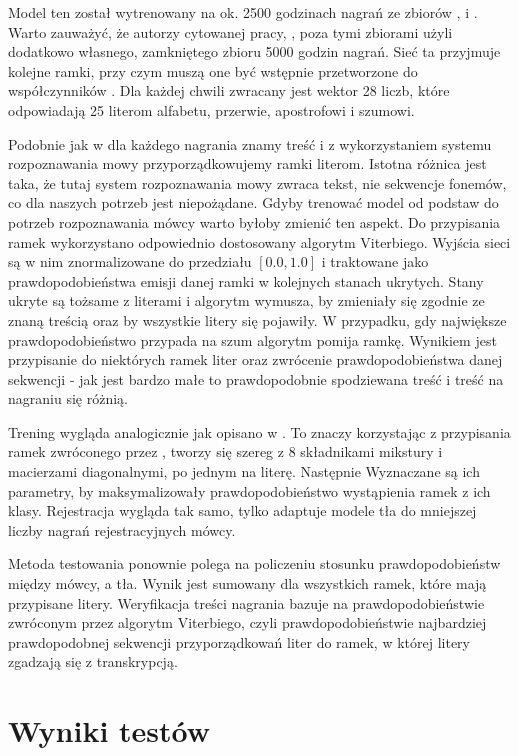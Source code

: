 Model ten został wytrenowany na ok. 2500 godzinach nagrań ze zbiorów , 
i . Warto zauważyć, że autorzy cytowanej pracy, , poza tymi zbiorami użyli
dodatkowo własnego, zamkniętego zbioru 5000 godzin nagrań. Sieć ta przyjmuje kolejne ramki, przy czym muszą
one być wstępnie przetworzone do współczynników . Dla każdej chwili zwracany jest wektor 28 liczb,
które odpowiadają 25 literom alfabetu, przerwie, apostrofowi i szumowi.

Podobnie jak w  dla każdego nagrania znamy treść i z wykorzystaniem systemu rozpoznawania
mowy przyporządkowujemy ramki literom. Istotna różnica jest taka, że tutaj system rozpoznawania mowy zwraca
tekst, nie sekwencje fonemów, co dla naszych potrzeb jest niepożądane. Gdyby trenować model od podstaw do
potrzeb rozpoznawania mówcy warto byłoby zmienić ten aspekt. Do przypisania ramek wykorzystano odpowiednio
dostosowany algorytm Viterbiego. Wyjścia sieci są w nim znormalizowane do przedziału $[0.0, 1.0]$ i traktowane
jako prawdopodobieństwa emisji danej ramki w kolejnych stanach ukrytych. Stany ukryte są tożsame z literami
i algorytm wymusza, by zmieniały się zgodnie ze znaną treścią oraz by wszystkie litery się pojawiły.
W przypadku, gdy największe prawdopodobieństwo przypada na szum algorytm pomija ramkę. Wynikiem
jest przypisanie do niektórych ramek liter oraz zwrócenie prawdopodobieństwa danej sekwencji - jak jest
bardzo małe to prawdopodobnie spodziewana treść i treść na nagraniu się różnią.

Trening wygląda analogicznie jak opisano w . To znaczy korzystając z przypisania ramek
zwróconego przez , tworzy się szereg  z $8$ składnikami mikstury
i macierzami diagonalnymi, po jednym na literę. Następnie Wyznaczane są ich parametry, by
maksymalizowały prawdopodobieństwo wystąpienia
ramek z ich klasy. Rejestracja wygląda tak samo, tylko  adaptuje modele tła do
mniejszej liczby nagrań rejestracyjnych mówcy.

Metoda testowania ponownie polega na policzeniu stosunku prawdopodobieństw między  mówcy, a tła.
Wynik jest sumowany dla wszystkich ramek, które mają przypisane litery. Weryfikacja treści nagrania
bazuje na prawdopodobieństwie zwróconym przez algorytm Viterbiego, czyli prawdopodobieństwie najbardziej
prawdopodobnej sekwencji przyporządkowań liter do ramek, w której litery zgadzają się z transkrypcją.

\section{Wyniki testów}
\label{sec:test_results}

